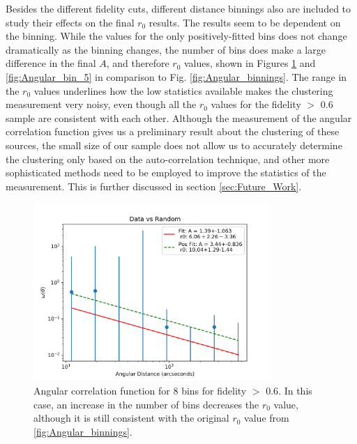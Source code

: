 Besides the different fidelity cuts, different distance binnings also are included to study their effects on the final $r_0$ results. The results seem to be dependent on the binning. While the values for the only positively-fitted bins does not change dramatically as the binning changes, the number of bins does make a large difference in the final $A$, and therefore $r_0$ values, shown in Figures \ref{fig:Angular_bin_8} and \ref{fig:Angular_bin_5} in comparison to Fig. \ref{fig:Angular_binnings}. The range in the $r_0$ values underlines how the low statistics available makes the clustering measurement very noisy, even though all the $r_0$ values for the fidelity $>$ 0.6 sample are consistent with each other. Although the measurement of the angular correlation function gives us a preliminary result about the clustering of these sources, the small size of our sample does not allow us to accurately determine the clustering only based on the auto-correlation technique, and other more sophisticated methods need to be employed to improve the statistics of the measurement. This is further discussed in section \ref{sec:Future_Work}.

\begin{figure}[!htbp]
\centering \includegraphics[width=90mm]{clustering_two/Data_vs_Random_20000_bin8_sn0_6_NFalse.png}
\caption{Angular correlation function for 8 bins  for fidelity $>$ 0.6. In this case, an increase in the number of bins decreases the $r_0$ value, although it is still consistent with the original $r_0$ value from \ref{fig:Angular_binnings}.}
\label{fig:Angular_bin_8}
\end{figure}

